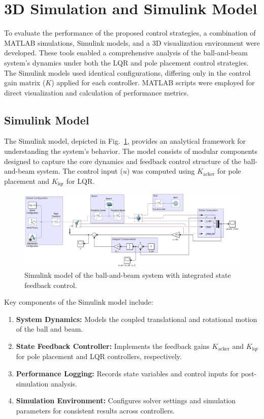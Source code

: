 \documentclass[conference]{IEEEtran}
\begin{document}
\section{3D Simulation and Simulink Model}
\label{sec:simulation_model}

To evaluate the performance of the proposed control strategies, a combination of MATLAB simulations, Simulink models, and a 3D visualization environment were developed. These tools enabled a comprehensive analysis of the ball-and-beam system's dynamics under both the LQR and pole placement control strategies. The Simulink models used identical configurations, differing only in the control gain matrix (\(K\)) applied for each controller. MATLAB scripts were employed for direct visualization and calculation of performance metrics.

\subsection{Simulink Model}
\label{subsec:simulink_model}

The Simulink model, depicted in Fig.~\ref{fig:simulink_model}, provides an analytical framework for understanding the system's behavior. The model consists of modular components designed to capture the core dynamics and feedback control structure of the ball-and-beam system. The control input (\(u\)) was computed using \(K_{\text{acker}}\) for pole placement and \(K_{\text{lqr}}\) for LQR.

\begin{figure}[H]
    \centering
    \includegraphics[width=\linewidth]{figures/simulink_model.png}
    \caption{Simulink model of the ball-and-beam system with integrated state feedback control.}
    \label{fig:simulink_model}
\end{figure}

Key components of the Simulink model include:
\begin{enumerate}
    \item \textbf{System Dynamics:} Models the coupled translational and rotational motion of the ball and beam.
    \item \textbf{State Feedback Controller:} Implements the feedback gains \(K_{\text{acker}}\) and \(K_{\text{lqr}}\) for pole placement and LQR controllers, respectively.
    \item \textbf{Performance Logging:} Records state variables and control inputs for post-simulation analysis.
    \item \textbf{Simulation Environment:} Configures solver settings and simulation parameters for consistent results across controllers.
\end{enumerate}
\end{document}
